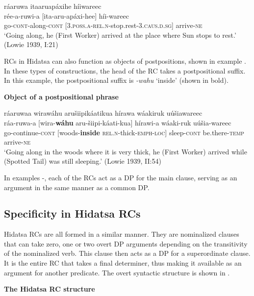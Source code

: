 \documentclass[output=paper]{LSP/langsci}
\begin{document}
\glll r\'aaruwa  {\ob}itaaruap\'axihe{\cb}   h\'iiwareec\\
r\'ee-a-ruwi-a  [ita-aru-ap\'axi-hee] h\'ii-wareec\\
go-\textsc{cont}-along-\textsc{cont} [\textsc{3.poss.a-rel.n}-stop.rest-\textsc{3.caus.d.sg}] arrive-\textsc{ne}\\
\trans `Going along, he (First Worker) arrived at the place where Sun stops to rest.' (Lowie 1939, I:21)
\z

RCs in Hidatsa can also function as objects of postpositions, shown in example . In these types of constructions, the head of the RC takes a postpositional suffix. In this example, the postpositional suffix is \textit{-wahu} `inside' (shown in bold). 

\ea \textbf{Object of a postpositional phrase} \label{boyle5}

\glll r\'aaruwaa   {\ob}wiraw\'ahu  aru\v{s}iipik\'aatikua{\cb}   h\'irawa w\'aakiruk u\'u\v{s}iawareec\\
r\'aa-ruwa-a [wira-\textbf{w\'ahu} aru-\v{s}iipi-k\'aati-kua] h\'irawi-a w\'aaki-ruk u\'u\v{s}ia-wareec\\     
go-continue-\textsc{cont} [woods-\textbf{inside}  \textsc{rel.n}-thick-\textsc{emph-loc}] sleep-\textsc{cont} be.there-\textsc{temp} arrive-\textsc{ne}\\
\trans `Going along in the woods where it is very thick, he (First Worker) arrived while (Spotted Tail) was still sleeping.' (Lowie 1939, II:54)
\z

In examples -, each of the RCs act as a DP for the main clause, serving as an argument in the same manner as a common DP.

\subsection{Specificity in Hidatsa RCs} 

Hidatsa RCs are all formed in a similar manner. They are nominalized clauses that can take zero, one or two overt DP arguments depending on the transitivity of the nominalized verb. This clause then acts as a DP for a superordinate clause. It is the entire RC that takes a final determiner, thus making it available as an argument for another predicate. The overt syntactic structure is shown in .

\ea \textbf{The Hidatsa RC structure} \label{boyle6}
\end{document}
